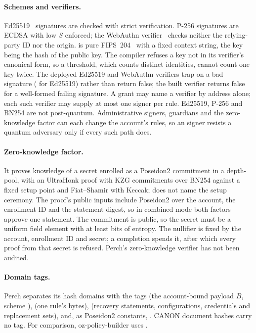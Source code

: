 \paragraph{Schemes and verifiers.} Ed25519~\cite{rfc8032} signatures are checked
with strict verification. P-256 signatures are ECDSA with low $S$ enforced; the
WebAuthn verifier~\cite{webauthn2} checks neither the relying-party ID nor the
origin.  is pure FIPS~204~\cite{fips204} with a fixed
context string, the key being the hash of the public key. The compiler refuses a
key not in its verifier's canonical form, so a threshold, which counts distinct
identities, cannot count one key twice. The deployed Ed25519 and WebAuthn
verifiers trap on a bad signature ( for Ed25519) rather
than return false; the built  verifier returns false for a
well-formed failing signature. A grant may name a verifier by address alone; each
such verifier may supply at most one signer per rule. Ed25519, P-256 and BN254
are not post-quantum. Administrative signers, guardians and the zero-knowledge
factor can each change the account's rules, so an  signer
resists a quantum adversary only if every such path does.

\paragraph{Zero-knowledge factor.} It proves knowledge of a secret enrolled as a
Poseidon2 commitment in a depth- pool, with an UltraHonk proof
with KZG commitments over BN254 against a fixed setup point and Fiat--Shamir with
Keccak;  does not name the setup ceremony. The proof's public
inputs include Poseidon2 over the account, the enrollment ID and the statement
digest, so in combined mode both factors approve one statement. The commitment is
public, so the secret must be a uniform field element with at least
 bits of entropy. The nullifier is fixed by the
account, enrollment ID and secret; a completion spends it, after which every
proof from that secret is refused. Perch's zero-knowledge verifier has not been
audited.

\paragraph{Domain tags.} Perch separates its hash domains with the tags
 (the account-bound payload $B$, scheme
),  (one rule's bytes),
 (recovery statements, configurations, credentials
and replacement sets), and, as Poseidon2 constants, . CANON
document hashes carry no tag. For comparison, oz-policy-builder uses
.

